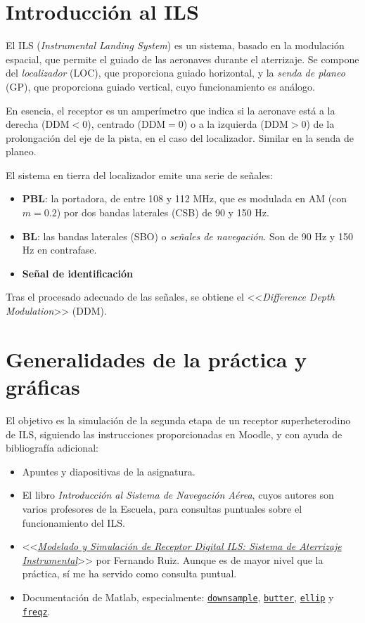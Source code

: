 \section*{Introducción al ILS}

El ILS (\textit{Instrumental Landing System}) es un sistema, basado en la modulación espacial, que permite el guiado de las aeronaves durante el aterrizaje. Se compone del \textit{localizador} (LOC), que proporciona guiado horizontal, y la \textit{senda de planeo} (GP), que proporciona guiado vertical, cuyo funcionamiento es análogo.

En esencia, el receptor es un amperímetro que indica si la aeronave está a la derecha ($\text{DDM}<0$), centrado ($\text{DDM} = 0$) o a la izquierda ($\text{DDM} >0$) de la prolongación del eje de la pista, en el caso del localizador. Similar en la senda de planeo.

El sistema en tierra del localizador emite una serie de señales:
\begin{itemize}
    \item \textbf{PBL}: la portadora, de entre 108 y 112 MHz, que es modulada en AM (con $m=0.2$) por dos bandas laterales (CSB) de 90 y 150 Hz.
    \item \textbf{BL}: las bandas laterales (SBO) o \textit{señales de navegación}. Son de 90 Hz y 150 Hz en contrafase.
    \item \textbf{Señal de identificación}
\end{itemize}

Tras el procesado adecuado de las señales, se obtiene el <<\textit{Difference Depth Modulation}>> (DDM).

\section*{Generalidades de la práctica y gráficas}
El objetivo es la simulación de la segunda etapa de un receptor superheterodino de ILS, siguiendo las instrucciones proporcionadas en Moodle, y con ayuda de bibliografía adicional:
\begin{itemize}
    \item Apuntes y diapositivas de la asignatura.
    \item El libro \textit{Introducción al Sistema de Navegación Aérea}, cuyos autores son varios profesores de la Escuela, para consultas puntuales sobre el funcionamiento del ILS.
    \item <<\textcolor{blue}{\textit{\href{https://biblus.us.es/bibing/proyectos/abreproy/91195/fichero/TFG.pdf}{Modelado y Simulación de Receptor Digital ILS: Sistema de Aterrizaje Instrumental}}}>> por Fernando Ruiz. Aunque es de mayor nivel que la práctica, sí me ha servido como consulta puntual.
    \item Documentación de Matlab, especialmente: \textcolor{blue}{\href{https://es.mathworks.com/help/signal/ref/downsample.html}{\texttt{downsample}}}, \textcolor{blue}{\href{https://es.mathworks.com/help/signal/ref/butter.html}{\texttt{butter}}}, \textcolor{blue}{\href{https://es.mathworks.com/help/signal/ref/ellip.html}{\texttt{ellip}}} y \textcolor{blue}{\href{https://es.mathworks.com/help/signal/ref/freqz.html}{\texttt{freqz}}}.
\end{itemize}

